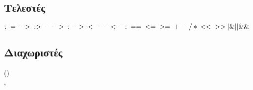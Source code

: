 \documentclass{article}
\begin{document}
\newpage

\subsection{Τελεστές}

$
: \\ 
= \\ 
->\\
:>\\
-->\\
:->\\
<--\\
<-:\\
\\
== \\ 
<= \\ 
>= \\ 
+ \\
- \\
/ \\
* \\
\\
<< \\ 
>> \\ 
| \\ 
\& \\ 
|| \\ 
\&\& 
$


\subsection{Διαχωριστές}

() \\
,

\end{document}
